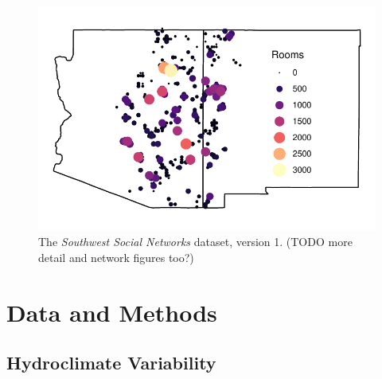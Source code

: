 \documentclass[10pt]{iopart}
\begin{document}

\begin{figure}[!htbp]
\centering
\includegraphics[width=.9\linewidth]{figures/site_distribution.pdf}
\caption{The \emph{Southwest Social Networks} dataset, version 1. (TODO more detail and network figures too?)} 
\label{fig:network-plot}
\end{figure}

\section*{Data and Methods}

\subsection*{Hydroclimate Variability}
\end{document}

